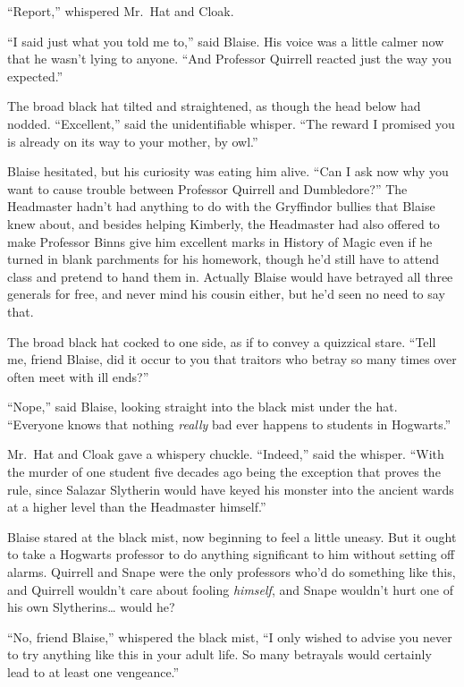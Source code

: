 ``Report,'' whispered Mr.~Hat and Cloak.

``I said just what you told me to,'' said Blaise. His voice was a little
calmer now that he wasn't lying to anyone. ``And Professor Quirrell
reacted just the way you expected.''

The broad black hat tilted and straightened, as though the head below
had nodded. ``Excellent,'' said the unidentifiable whisper. ``The reward
I promised you is already on its way to your mother, by owl.''

Blaise hesitated, but his curiosity was eating him alive. ``Can I ask
now why you want to cause trouble between Professor Quirrell and
Dumbledore?'' The Headmaster hadn't had anything to do with the
Gryffindor bullies that Blaise knew about, and besides helping Kimberly,
the Headmaster had also offered to make Professor Binns give him
excellent marks in History of Magic even if he turned in blank
parchments for his homework, though he'd still have to attend class and
pretend to hand them in. Actually Blaise would have betrayed all three
generals for free, and never mind his cousin either, but he'd seen no
need to say that.

The broad black hat cocked to one side, as if to convey a quizzical
stare. ``Tell me, friend Blaise, did it occur to you that traitors who
betray so many times over often meet with ill ends?''

``Nope,'' said Blaise, looking straight into the black mist under the
hat. ``Everyone knows that nothing \emph{really} bad ever happens to
students in Hogwarts.''

Mr.~Hat and Cloak gave a whispery chuckle. ``Indeed,'' said the whisper.
``With the murder of one student five decades ago being the exception
that proves the rule, since Salazar Slytherin would have keyed his
monster into the ancient wards at a higher level than the Headmaster
himself.''

Blaise stared at the black mist, now beginning to feel a little uneasy.
But it ought to take a Hogwarts professor to do anything significant to
him without setting off alarms. Quirrell and Snape were the only
professors who'd do something like this, and Quirrell wouldn't care
about fooling \emph{himself}, and Snape wouldn't hurt one of his own
Slytherins\ldots{} would he?

``No, friend Blaise,'' whispered the black mist, ``I only wished to
advise you never to try anything like this in your adult life. So many
betrayals would certainly lead to at least one vengeance.''

